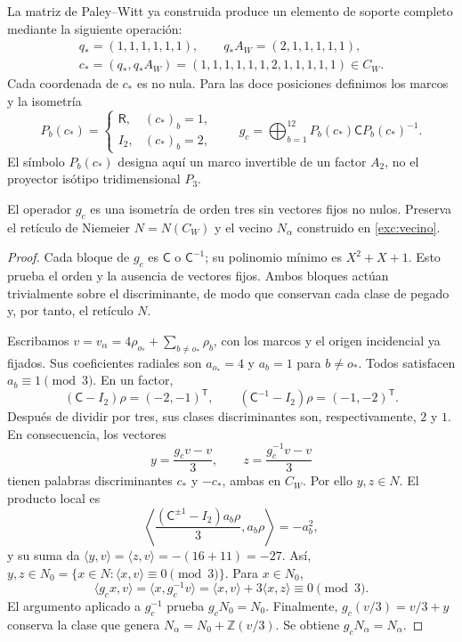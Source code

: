La matriz de Paley--Witt ya construida produce un elemento de soporte
completo mediante la siguiente operación:
\begin{equation}
 \begin{gathered}
 q_*=(1,1,1,1,1,1),\qquad q_*A_W=(2,1,1,1,1,1),\\
 c_*=(q_*,q_*A_W)
 =(1,1,1,1,1,1,2,1,1,1,1,1)\in C_W.
 \end{gathered}
 \label{km:palabra-total}
\end{equation}
Cada coordenada de \(c_*\) es no nula. Para las doce posiciones
definimos los marcos y la isometría
\begin{equation}
 P_b(c_*)=
 \begin{cases}\mathsf R,&(c_*)_b=1,\\I_2,&(c_*)_b=2,\end{cases}
 \qquad
 g_c=\bigoplus_{b=1}^{12}P_b(c_*)\mathsf C P_b(c_*)^{-1}.
 \label{km:isometria-ternaria}
\end{equation}
El símbolo \(P_b(c_*)\) designa aquí un marco invertible de un factor
\(A_2\), no el proyector isótipo tridimensional \(P_3\).

\begin{proposition}
\label{km:estabilidad-vecino}
El operador \(g_c\) es una isometría de orden tres sin vectores fijos
no nulos. Preserva el retículo de Niemeier \(N=N(C_W)\) y el vecino
\(N_\alpha\) construido en \eqref{exc:vecino}.
\end{proposition}
\begin{proof}
Cada bloque de \(g_c\) es \(\mathsf C\) o \(\mathsf C^{-1}\);
su polinomio mínimo es \(X^2+X+1\). Esto prueba el orden y la
ausencia de vectores fijos. Ambos bloques actúan trivialmente sobre el
discriminante, de modo que conservan cada clase de pegado y, por tanto,
el retículo \(N\).

Escribamos \(v=v_\alpha=4\rho_{o_*}+\sum_{b\ne o_*}\rho_b\),
con los marcos y el origen incidencial ya fijados. Sus coeficientes
radiales son \(a_{o_*}=4\) y \(a_b=1\) para \(b\ne o_*\).
Todos satisfacen \(a_b\equiv1\pmod3\). En un factor,
\[
 (\mathsf C-I_2)\rho=(-2,-1)^{\mathsf T},\qquad
 (\mathsf C^{-1}-I_2)\rho=(-1,-2)^{\mathsf T}.
\]
Después de dividir por tres, sus clases discriminantes son,
respectivamente, \(2\) y \(1\). En consecuencia, los vectores
\begin{equation}
 y=\frac{g_cv-v}{3},\qquad z=\frac{g_c^{-1}v-v}{3}
 \label{km:desplazamientos}
\end{equation}
tienen palabras discriminantes \(c_*\) y \(-c_*\), ambas en
\(C_W\). Por ello \(y,z\in N\). El producto local es
\[
 \left\langle
 \frac{(\mathsf C^{\pm1}-I_2)a_b\rho}{3},a_b\rho
 \right\rangle=-a_b^2,
\]
y su suma da
\(\langle y,v\rangle=\langle z,v\rangle=-(16+11)=-27\).
Así, \(y,z\in N_0=\{x\in N:\langle x,v\rangle\equiv0\pmod3\}\).
Para \(x\in N_0\),
\[
 \langle g_cx,v\rangle
 =\langle x,g_c^{-1}v\rangle
 =\langle x,v\rangle+3\langle x,z\rangle\equiv0\pmod3.
\]
El argumento aplicado a \(g_c^{-1}\) prueba \(g_cN_0=N_0\).
Finalmente, \(g_c(v/3)=v/3+y\) conserva la clase que genera
\(N_\alpha=N_0+\mathbb Z(v/3)\). Se obtiene
\(g_cN_\alpha=N_\alpha\).
\end{proof}

